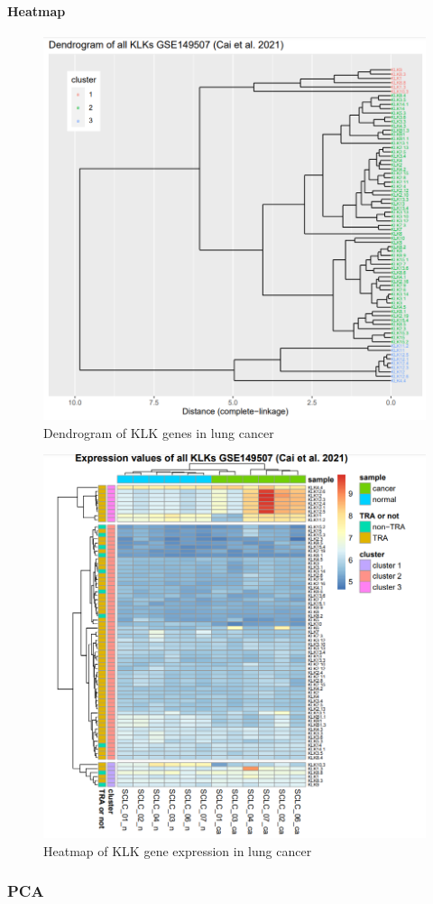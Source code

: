 \documentclass[
]{article}
\begin{document}
\hypertarget{heatmap-1}{%
\paragraph{Heatmap}\label{heatmap-1}}

\begin{figure}

{\centering \includegraphics[width=0.5\linewidth]{images/Dendrogram_lung} 

}

\caption{Dendrogram of KLK genes in lung cancer}\label{fig:Dendrogram - lung }
\end{figure}

\begin{figure}

{\centering \includegraphics[width=0.5\linewidth]{images/Heatmap_lung} 

}

\caption{Heatmap of KLK gene expression in lung cancer}\label{fig:Heatmap - lung }
\end{figure}

\hypertarget{pca-1}{%
\subsubsection{PCA}\label{pca-1}}
\end{document}
